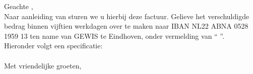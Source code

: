 \documentclass[
 digital,         %
]{GEWISLetter}
\newcommand{\GEWIScontact}{%
\\%
}
\begin{document}
\GEWISfirstpage                 %
\printadresenkenmerk            %


Geachte %
,\\[2\baselineskip]
Naar aanleiding van %
 sturen we u hierbij deze factuur. Gelieve het verschuldigde bedrag binnen vijftien werkdagen over te maken naar IBAN NL22 ABNA 0528 1959 13 ten name van GEWIS te Eindhoven, onder vermelding van ``%
''.\\[\baselineskip]
Hieronder volgt een specificatie:\\[\baselineskip]
\\[2\baselineskip]
Met vriendelijke groeten,\\[2\baselineskip]
\GEWIScontact
\end{document}
